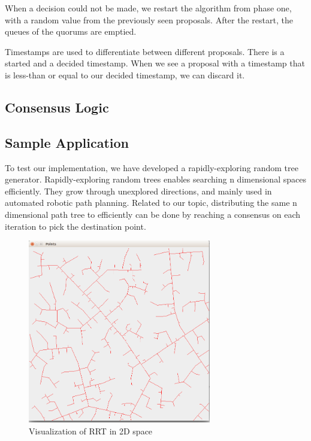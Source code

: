 \documentclass[times, 12pt,twocolumn]{article}
\begin{document}
When a decision could not be made, we restart the algorithm from phase one, with 
a random value from the previously seen proposals. After the restart, the 
queues of the quorums are emptied.

Timestamps are used to differentiate between different proposals. There is a started 
and a decided timestamp. When we see a proposal with a timestamp that is less-than 
or equal to our decided timestamp, we can discard it.



\subsection{Consensus Logic}

\subsection{Sample Application}

To test our implementation, we have developed a rapidly-exploring random tree generator. Rapidly-exploring random trees\cite{Lavalle98rapidly-exploringrandom} enables searching n dimensional spaces efficiently. They grow through unexplored directions, and mainly used in automated robotic path planning. Related to our topic, distributing the same n dimensional path tree to efficiently can be done by reaching a consensus on each iteration to pick the destination point.


\begin{figure}[ht!]
\centering
\includegraphics[width=80mm]{rrt.png}
\caption{Visualization of RRT in 2D space}
\label{fig:rrt}
\end{figure}
\end{document}
